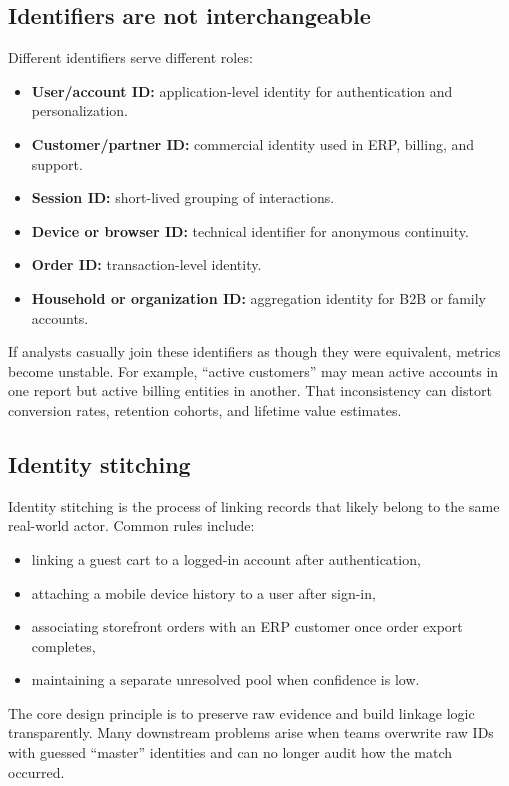 \subsection{Identifiers are not interchangeable}
Different identifiers serve different roles:
\begin{itemize}
  \item \textbf{User/account ID:} application-level identity for authentication and personalization.
  \item \textbf{Customer/partner ID:} commercial identity used in ERP, billing, and support.
  \item \textbf{Session ID:} short-lived grouping of interactions.
  \item \textbf{Device or browser ID:} technical identifier for anonymous continuity.
  \item \textbf{Order ID:} transaction-level identity.
  \item \textbf{Household or organization ID:} aggregation identity for B2B or family accounts.
\end{itemize}

If analysts casually join these identifiers as though they were equivalent, metrics become unstable.
For example, ``active customers'' may mean active accounts in one report but active billing entities in another.
That inconsistency can distort conversion rates, retention cohorts, and lifetime value estimates.

\subsection{Identity stitching}
Identity stitching is the process of linking records that likely belong to the same real-world actor.
Common rules include:
\begin{itemize}
  \item linking a guest cart to a logged-in account after authentication,
  \item attaching a mobile device history to a user after sign-in,
  \item associating storefront orders with an ERP customer once order export completes,
  \item maintaining a separate unresolved pool when confidence is low.
\end{itemize}

The core design principle is to preserve raw evidence and build linkage logic transparently.
Many downstream problems arise when teams overwrite raw IDs with guessed ``master'' identities and can no longer audit how the match occurred.

